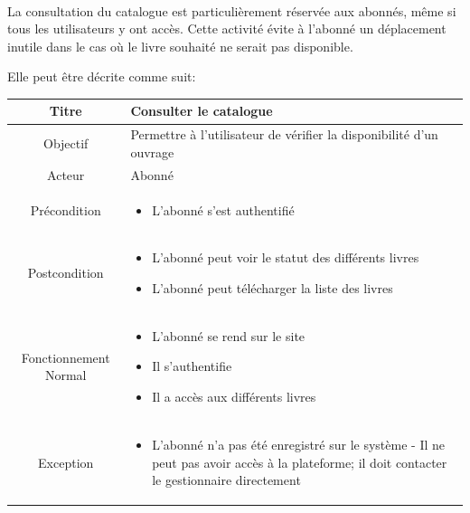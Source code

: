 \paragraph{}
La consultation du catalogue est particulièrement réservée aux abonnés, même si 
tous les utilisateurs y ont accès. Cette activité évite à l'abonné un déplacement
inutile dans le cas où le livre souhaité ne serait pas disponible. \par 
Elle peut être décrite comme suit: \par 
\begin{tabular}{|c|p{7cm}|}
        \hline
        Titre & Consulter le catalogue  \\
        \hline
        Objectif & Permettre à l'utilisateur de vérifier la disponibilité d'un ouvrage \\
        \hline
        Acteur & Abonné \\
        \hline
        Précondition & \begin{itemize}
                \item L'abonné s'est authentifié 
        \end{itemize} \\
        \hline
        Postcondition & \begin{itemize}
                \item L'abonné peut voir le statut des différents livres
                \item L'abonné peut télécharger la liste des livres
        \end{itemize} \\
        \hline
        Fonctionnement Normal & \begin{itemize}
                \item L'abonné se rend sur le site
                \item Il s'authentifie
                \item Il a accès aux différents livres
        \end{itemize} \\
        \hline
        Exception & \begin{itemize}
                \item L'abonné n'a pas été enregistré sur le système - Il ne peut pas avoir accès à la plateforme; il 
                doit contacter le gestionnaire directement
        \end{itemize} \\
        \hline
\end{tabular}

